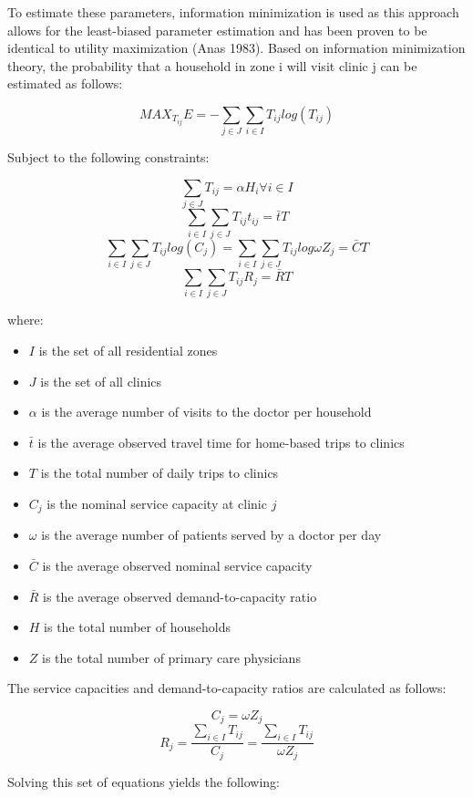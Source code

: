 \documentclass{article}
\begin{document}
To estimate these parameters, information minimization is used as this
approach allows for the least-biased parameter estimation and has been
proven to be identical to utility maximization (Anas 1983). Based on
information minimization theory, the probability that a household in
zone i will visit clinic j can be estimated as follows:

\[
MAX_{T_{ij}} E = -\sum_{j \in J} \sum_{i \in I} T_{ij} log(T_{ij})
\]

Subject to the following constraints:

\[
\sum_{j \in J}T_{ij} = \alpha H_i \forall i \in I 
\] \[
\sum_{i \in I} \sum_{j \in J} T_{ij} t_{ij} = \bar{t}T 
\] \[
\sum_{i \in I} \sum_{j \in J} T_{ij} log(C_j) = \sum_{i \in I} \sum_{j \in J}T_{ij} log \omega Z_j = \bar{C}T 
\] \[
\sum_{i \in I} \sum_{j \in J} T_{ij} R_j = \bar{R}T
\]

where:

\begin{itemize}
\item
  \(I\) is the set of all residential zones
\item
  \(J\) is the set of all clinics
\item
  \(\alpha\) is the average number of visits to the doctor per household
\item
  \(\bar{t}\) is the average observed travel time for home-based trips
  to clinics
\item
  \(T\) is the total number of daily trips to clinics
\item
  \(C_j\) is the nominal service capacity at clinic \(j\)
\item
  \(\omega\) is the average number of patients served by a doctor per
  day
\item
  \(\bar{C}\) is the average observed nominal service capacity
\item
  \(\bar{R}\) is the average observed demand-to-capacity ratio
\item
  \(H\) is the total number of households
\item
  \(Z\) is the total number of primary care physicians
\end{itemize}

The service capacities and demand-to-capacity ratios are calculated as
follows:

\[
C_j = \omega Z_j
\] \[
R_j = \frac{\sum_{i \in I} T_{ij}}{C_j} = \frac{\sum_{i \in I} T_{ij}}{\omega Z_j}
\]

Solving this set of equations yields the following:
\end{document}
